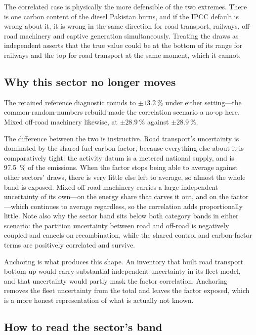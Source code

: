 The correlated case is physically the more defensible of the two extremes. There is one carbon
content of the diesel Pakistan burns, and if the IPCC default is wrong about it, it is wrong
in the same direction for road transport, railways, off-road machinery and captive generation
simultaneously. Treating the draws as independent asserts that the true value could be at the
bottom of its range for railways and the top for road transport at the same moment, which it
cannot.

\subsection{Why this sector no longer moves}

The retained reference diagnostic rounds to $\pm\SI{13.2}{\percent}$ under either setting---the
common-random-numbers rebuild made the correlation scenario a no-op here. Mixed off-road
machinery likewise, at $\pm\SI{28.9}{\percent}$ against $\pm\SI{28.9}{\percent}$.

The difference between the two is instructive. Road transport's uncertainty is dominated by
the shared fuel-carbon factor, because everything else about it is comparatively tight: the
activity datum is a metered national supply, and \COtwo{} is \SI{97.5}{\percent} of the
emissions. When the factor stops being able to average against other sectors' draws, there is
very little else left to average, so almost the whole band is exposed. Mixed off-road machinery
carries a large independent uncertainty of its own---on the energy share that
carves it out, and on the \NtwoO{} factor---which continues to average regardless, so the
correlation adds proportionally little. Note also why the sector band sits below both
category bands in either scenario: the partition uncertainty between road and off-road is
negatively coupled and cancels on recombination, while the shared control and
carbon-factor terms are positively correlated and survive.

Anchoring is what produces this shape. An inventory that built road transport bottom-up would
carry substantial independent uncertainty in its fleet model, and that uncertainty would
partly mask the factor correlation. Anchoring removes the fleet uncertainty from the total and
leaves the factor exposed, which is a more honest representation of what is actually not
known.

\subsection{How to read the sector's band}

